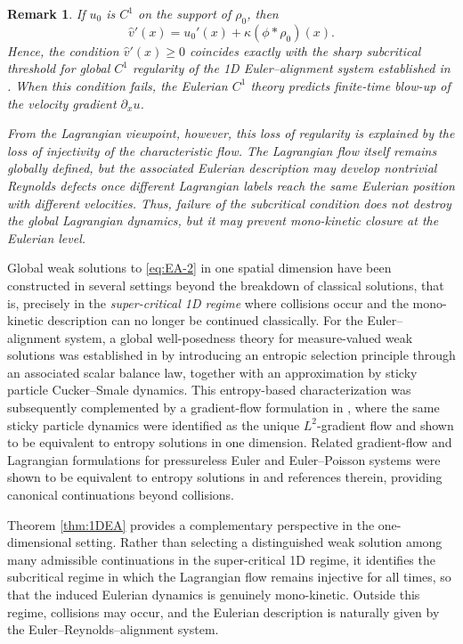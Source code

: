 \documentclass[10pt,reqno]{amsart}
\renewcommand{\ge}{\geqslant}
\numberwithin{equation}{section}
\newtheorem{remark}{Remark}[section]
\newcommand{\pa}{\partial}
\begin{document}
 \begin{remark} 
If $u_0$ is $C^1$ on the support of $\rho_0$, then
\[
\widehat v'(x)=u_0'(x)+\kappa(\phi*\rho_0)(x).
\]
Hence, the condition $\widehat v'(x)\ge0$ coincides exactly with the sharp subcritical threshold for global $C^1$ regularity of the 1D Euler--alignment system established in \cite{CCTT16}. When this condition fails, the Eulerian $C^1$ theory predicts finite-time blow-up of the velocity gradient $\pa_x u$. 

 From the Lagrangian viewpoint, however, this loss of regularity is explained by the loss of injectivity of the characteristic flow. The Lagrangian flow itself remains globally defined, but the associated Eulerian description may develop nontrivial Reynolds defects once different Lagrangian labels reach the same Eulerian position with different velocities. Thus, failure of the subcritical condition does not destroy the global Lagrangian dynamics, but it may prevent mono-kinetic closure at the Eulerian level.
\end{remark}

Global weak solutions to \eqref{eq:EA-2} in one spatial dimension have been constructed in several settings beyond the breakdown of classical solutions, that is, precisely in the \emph{super-critical 1D regime} where collisions occur and the mono-kinetic description can no longer be continued classically. For the Euler--alignment system, a global well-posedness theory for measure-valued weak solutions was established in \cite{LT23} by introducing an entropic selection principle through an associated scalar balance law, together with an approximation by sticky particle Cucker--Smale dynamics. This entropy-based characterization was subsequently complemented by a gradient-flow formulation in \cite{Gal25}, where the same sticky particle dynamics were identified as the unique $L^2$-gradient flow and shown to be equivalent to entropy solutions in one dimension. Related gradient-flow and Lagrangian formulations for pressureless Euler and Euler--Poisson systems were shown to be equivalent to entropy solutions in \cite{CGpre} and references therein, providing canonical continuations beyond collisions.

Theorem \ref{thm:1DEA} provides a complementary perspective in the one-dimensional setting. Rather than selecting a distinguished weak solution among many admissible continuations in the super-critical 1D regime, it identifies the subcritical regime in which the Lagrangian flow remains injective for all times, so that the induced Eulerian dynamics is genuinely mono-kinetic. Outside this regime, collisions may occur, and the Eulerian description is naturally given by the Euler--Reynolds--alignment system.
 
\end{document}
